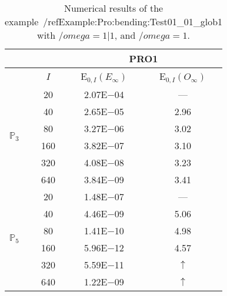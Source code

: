 \begin{table}[H]
\caption{Numerical results of the example~/ref{Example:Pro:bending:Test01_01_glob1} with $/omega=1|1$, and $/omega=1$.}
\setlength{\tabcolsep}{5pt}
\centering
\begin{tabular}{@{}l c c c@{}}
\toprule
 &  & \multicolumn{2}{c}{PRO1}\\
\midrule
 & $I$ & E$_{0,I}(E_{\infty})$ & E$_{0,I}(O_{\infty})$\\
\midrule
\multirow{6}{*}{$\mathbb{P}_{3}$}
 & 20 & 2.07E$-$04 & ---\\
 & 40 & 2.65E$-$05 & 2.96\\
 & 80 & 3.27E$-$06 & 3.02\\
 & 160 & 3.82E$-$07 & 3.10\\
 & 320 & 4.08E$-$08 & 3.23\\
 & 640 & 3.84E$-$09 & 3.41\\
\midrule
\multirow{6}{*}{$\mathbb{P}_{5}$}
 & 20 & 1.48E$-$07 & ---\\
 & 40 & 4.46E$-$09 & 5.06\\
 & 80 & 1.41E$-$10 & 4.98\\
 & 160 & 5.96E$-$12 & 4.57\\
 & 320 & 5.59E$-$11 & $\uparrow$\\
 & 640 & 1.22E$-$09 & $\uparrow$\\
\bottomrule
\end{tabular}
\label{Table:PRO:test_01_01_test2_pro1}
\end{table}
